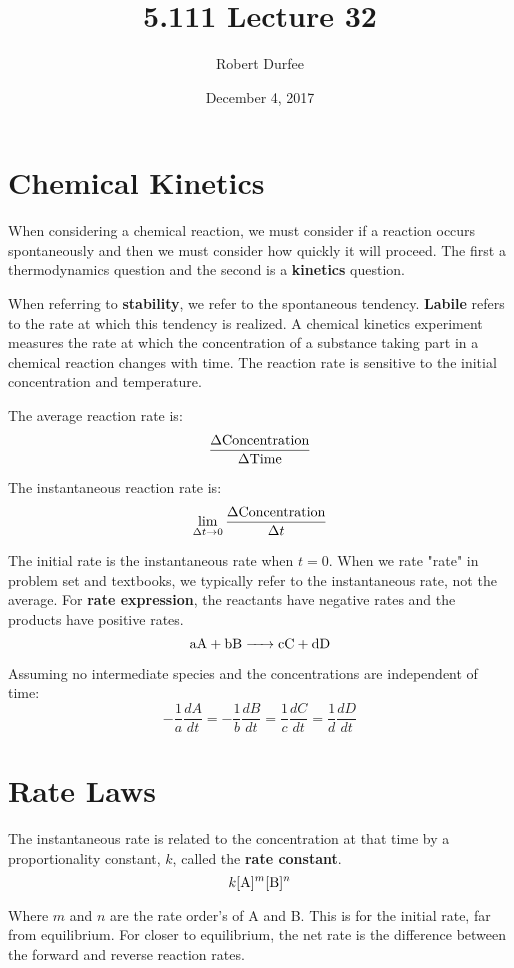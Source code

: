 \documentclass{article}
\title{ 5.111 Lecture 32 }
\author{ Robert Durfee }
\date{ December 4, 2017 }
\begin{document}
\maketitle

\section{ Chemical Kinetics }

When considering a chemical reaction, we must consider if a reaction occurs
spontaneously and then we must consider how quickly it will proceed. The first a
thermodynamics question and the second is a \textbf{kinetics} question. 

When referring to \textbf{stability}, we refer to the spontaneous tendency.
\textbf{Labile} refers to the rate at which this tendency is realized. A
chemical kinetics experiment measures the rate at which the concentration of a
substance taking part in a chemical reaction changes with time. The reaction
rate is sensitive to the initial concentration and temperature. 

The average reaction rate is:
$$ \frac{ \rm{ \Delta Concentration } }{ \rm{ \Delta Time } } $$

The instantaneous reaction rate is:
$$ \lim_{\Delta t \rightarrow 0} \frac{ \Delta \rm{ Concentration } }{ \Delta t }$$

The initial rate is the instantaneous rate when $t=0$. When we rate "rate" in
problem set and textbooks, we typically refer to the instantaneous rate, not the
average. For \textbf{rate expression}, the reactants have negative rates and the
products have positive rates. 
$$ \ce{ aA + bB -> cC + dD } $$

Assuming no intermediate species and the concentrations are independent of time:
$$ -\frac{ 1 }{ a }\frac{ dA }{ dt } = -\frac{ 1 }{ b }\frac{ dB }{ dt } =
\frac{ 1 }{ c }\frac{ dC }{ dt } = \frac{ 1 }{ d }\frac{ dD }{ dt } $$

\section{ Rate Laws }

The instantaneous rate is related to the concentration at that time by a
proportionality constant, $k$, called the \textbf{rate constant}. 
$$ k [ \ce{ A } ]^{m}[ \ce{ B } ]^{n} $$

Where $m$ and $n$ are the rate order's of A and B. This is for the initial rate,
far from equilibrium. For closer to equilibrium, the net rate is the difference
between the forward and reverse reaction rates.
\end{document}
